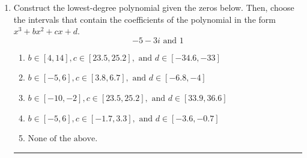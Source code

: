 \documentclass[14pt]{extbook}
\newcommand{\litem}[1]{\item#1\hspace*{-1cm}\rule{\textwidth}{0.4pt}}
\begin{document}
\begin{enumerate}
{\begin{enumerate}[label=\Alph*.]
\end{enumerate} }
\litem{
Construct the lowest-degree polynomial given the zeros below. Then, choose the intervals that contain the coefficients of the polynomial in the form $x^3+bx^2+cx+d$.\[ -5 - 3 i \text{ and } 1 \]\begin{enumerate}[label=\Alph*.]
\item \( b \in [4, 14], c \in [23.5, 25.2], \text{ and } d \in [-34.6, -33] \)
\item \( b \in [-5, 6], c \in [3.8, 6.7], \text{ and } d \in [-6.8, -4] \)
\item \( b \in [-10, -2], c \in [23.5, 25.2], \text{ and } d \in [33.9, 36.6] \)
\item \( b \in [-5, 6], c \in [-1.7, 3.3], \text{ and } d \in [-3.6, -0.7] \)
\item \( \text{None of the above.} \)

\end{enumerate} }
\end{enumerate}
\end{document}
